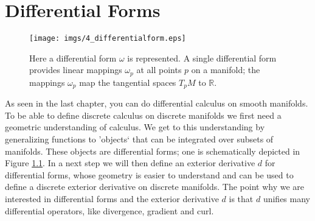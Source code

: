 \chapter{Differential Forms}

\begin{figure}[h]%
\begin{center}
\texttt{[image: imgs/4\_differentialform.eps]}%
\end{center}

\caption{Here a differential form $\omega$ is represented. A single differential form provides linear mappings $\omega_p$ at all points $p$ on a manifold; the mappings $\omega_p$ map the tangential spaces $T_pM$ to $\mathbb R$.}%
\label{fig:4_differentialform}%
\end{figure}
As seen in the last chapter, you can do differential calculus on smooth manifolds. To be able to define discrete calculus on discrete manifolds we first need a geometric understanding of calculus. We get to this understanding by generalizing functions to 'objects` that can be integrated over subsets of manifolds. These objects are differential forms; one is schematically depicted in Figure \ref{fig:4_differentialform}. In a next step we will then define an exterior derivative $d$ for differential forms, whose geometry is easier to understand and can be used to define a discrete exterior derivative on discrete manifolds.
 The point why we are interested in differential forms and the exterior derivative $d$ is that $d$ unifies many differential operators, like divergence, gradient and curl.


